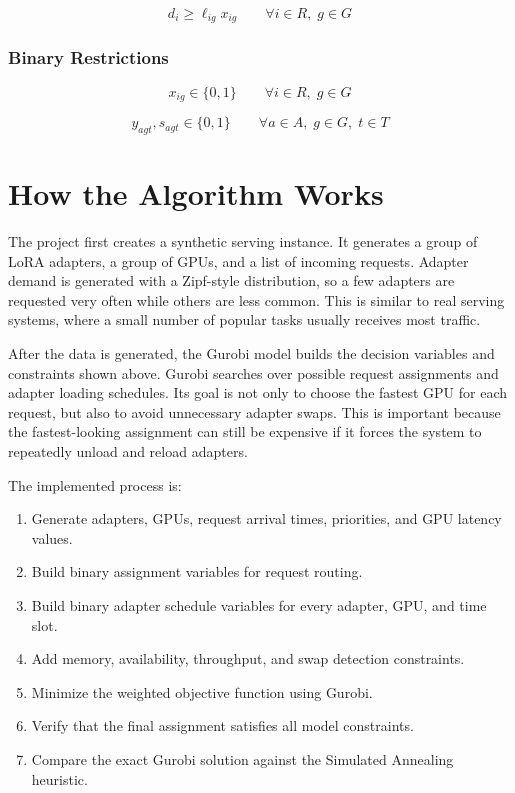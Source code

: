 \documentclass[12pt]{article}
\begin{document}
\[
d_i \geq \ell_{ig} x_{ig}
\qquad \forall i \in R,\; g \in G
\]

\subsubsection*{Binary Restrictions}

\[
x_{ig} \in \{0,1\}
\qquad \forall i \in R,\; g \in G
\]

\[
y_{agt}, s_{agt} \in \{0,1\}
\qquad \forall a \in A,\; g \in G,\; t \in T
\]

\section{How the Algorithm Works}

The project first creates a synthetic serving instance. It generates a group of
LoRA adapters, a group of GPUs, and a list of incoming requests. Adapter demand
is generated with a Zipf-style distribution, so a few adapters are requested
very often while others are less common. This is similar to real serving
systems, where a small number of popular tasks usually receives most traffic.

After the data is generated, the Gurobi model builds the decision variables and
constraints shown above. Gurobi searches over possible request assignments and
adapter loading schedules. Its goal is not only to choose the fastest GPU for
each request, but also to avoid unnecessary adapter swaps. This is important
because the fastest-looking assignment can still be expensive if it forces the
system to repeatedly unload and reload adapters.

The implemented process is:

\begin{enumerate}[label=\arabic*.]
    \item Generate adapters, GPUs, request arrival times, priorities, and GPU
    latency values.
    \item Build binary assignment variables for request routing.
    \item Build binary adapter schedule variables for every adapter, GPU, and
    time slot.
    \item Add memory, availability, throughput, and swap detection constraints.
    \item Minimize the weighted objective function using Gurobi.
    \item Verify that the final assignment satisfies all model constraints.
    \item Compare the exact Gurobi solution against the Simulated Annealing
    heuristic.
\end{enumerate}
\end{document}

